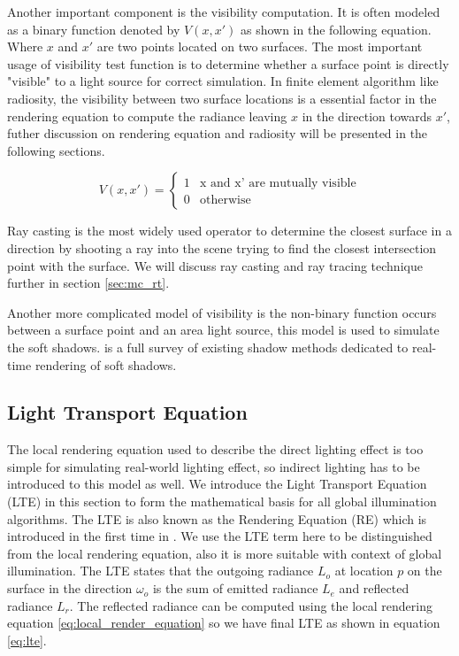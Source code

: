 Another important component is the visibility computation. It is often modeled as a binary function denoted by \(V(x, x')\) as shown in the following equation. Where \(x\) and \(x'\) are two points located on two surfaces. The most important usage of visibility test function is to determine whether a surface point is directly "visible" to a light source for correct simulation. In finite element algorithm like radiosity, the visibility between two surface locations is a essential factor in the rendering equation to compute the radiance leaving \(x\) in the direction towards \(x'\), futher discussion on rendering equation and radiosity will be presented in the following sections. 

  \begin{equation}
    V(x, x')=\left\{
    \begin{array}{ll}
      1  & \text{x and x' are mutually visible} \\
      0  & \text{otherwise}
    \end{array}
    \right.
    \label{eq:visibility_test}
  \end{equation}

Ray casting is the most widely used operator to determine the closest surface in a direction by shooting a ray into the scene trying to find the closest intersection point with the surface. We will discuss ray casting and ray tracing technique further in section \ref{sec:mc_rt}.

Another more complicated model of visibility is the non-binary function occurs between a surface point and an area light source, this model is used to simulate the soft shadows.  \cite{Hasenfratz2003} is a full survey of existing shadow methods dedicated to real-time rendering of soft shadows.

\subsection{Light Transport Equation}

The local rendering equation used to describe the direct lighting effect is too simple for simulating real-world lighting effect, so indirect lighting has to be introduced to this model as well. We introduce the Light Transport Equation (LTE) in this section to form the mathematical basis for all global illumination algorithms. The LTE is also known as the Rendering Equation (RE) which is introduced in the first time in \cite{Kajiya:1986:RE:15922.15902}. We use the LTE term here to be distinguished from the local rendering equation, also it is more suitable with context of global illumination. The LTE states that the outgoing radiance \(L_{o}\) at location \(p\) on the surface in the direction \(\omega_{o}\) is the sum of emitted radiance \(L_{e}\) and reflected radiance \(L_{r}\). The reflected radiance can be computed using the local rendering equation \ref{eq:local_render_equation} so we have final LTE as shown in equation \ref{eq:lte}.

